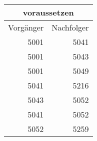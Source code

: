 {
\begin{tabular}[t]{|r|r|}
  \hline
  \multicolumn{2}{|c|}{voraussetzen}\\
  \hline
  Vorgänger & Nachfolger\\
  \hline\hline
  5001 & 5041\\
  5001 & 5043\\
  5001 & 5049\\
  5041 & 5216\\
  5043 & 5052\\
  5041 & 5052\\
  5052 & 5259\\
  \hline
\end{tabular}}
